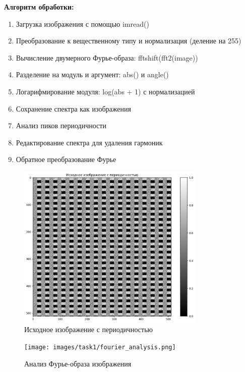 \textbf{Алгоритм обработки:}
\begin{enumerate}
    \item Загрузка изображения с помощью imread()
    \item Преобразование к вещественному типу и нормализация (деление на 255)
    \item Вычисление двумерного Фурье-образа: fftshift(fft2(image))
    \item Разделение на модуль и аргумент: abs() и angle()
    \item Логарифмирование модуля: log(abs + 1) с нормализацией
    \item Сохранение спектра как изображения
    \item Анализ пиков периодичности
    \item Редактирование спектра для удаления гармоник
    \item Обратное преобразование Фурье
\end{enumerate}

\begin{figure}[H]
    \centering
    \includegraphics[width=0.8\textwidth]{images/task1/original_image.png}
    \caption{Исходное изображение с периодичностью}
    \label{fig:original_periodic}
\end{figure}

\begin{figure}[H]
    \centering
    \texttt{[image: images/task1/fourier\_analysis.png]}
    \caption{Анализ Фурье-образа изображения}
    \label{fig:fourier_analysis}
\end{figure}

